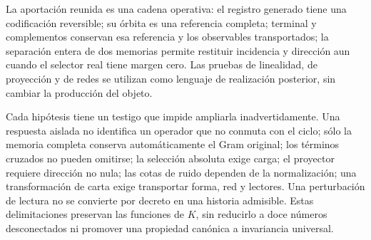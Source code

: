 La aportación reunida es una cadena operativa: el registro generado tiene
una codificación reversible; su órbita es una referencia completa;
terminal y complementos conservan esa referencia y los observables
transportados; la separación entera de dos memorias permite restituir
incidencia y dirección aun cuando el selector real tiene margen cero.
Las pruebas de linealidad, de proyección y de redes se utilizan como
lenguaje de realización posterior, sin cambiar la producción del objeto.

Cada hipótesis tiene un testigo que impide ampliarla inadvertidamente.
Una respuesta aislada no identifica un operador que no conmuta con el
ciclo; sólo la memoria completa conserva automáticamente el Gram original;
los términos cruzados no pueden omitirse; la selección absoluta exige
carga; el proyector requiere dirección no nula; las cotas de ruido
dependen de la normalización; una transformación de carta exige transportar
forma, red y lectores. Una perturbación de lectura no se convierte por
decreto en una historia admisible. Estas delimitaciones preservan las
funciones de \(K\), sin reducirlo a doce números desconectados ni
promover una propiedad canónica a invariancia universal.
